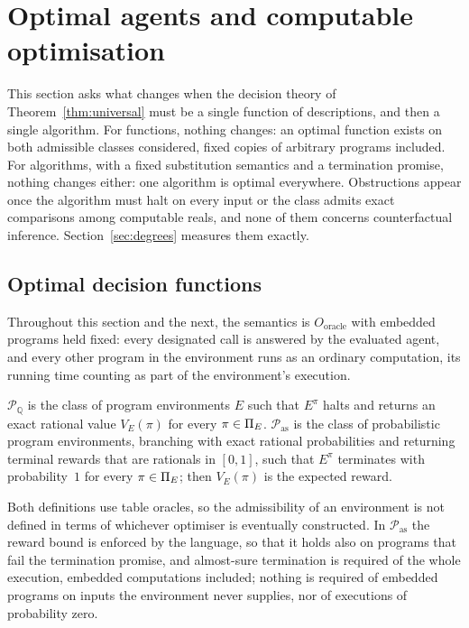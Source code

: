 \section{Optimal agents and computable optimisation}\label{sec:computation}

This section asks what changes when the decision theory of Theorem~\ref{thm:universal} must be a
single function of descriptions, and then a single algorithm. For functions, nothing changes: an
optimal function exists on both admissible classes considered, fixed copies of arbitrary programs
included. For algorithms, with a fixed substitution semantics and a termination promise, nothing
changes either: one algorithm is optimal everywhere. Obstructions appear once the algorithm must halt on every input or
the class admits exact comparisons among computable reals, and none of them concerns counterfactual
inference. Section~\ref{sec:degrees} measures them exactly.

\subsection{Optimal decision functions}

Throughout this section and the next, the semantics is $O_{\mathrm{oracle}}$ with embedded programs
held fixed: every designated call is answered by the evaluated agent, and every other program in the
environment runs as an ordinary computation, its running time counting as part of the environment's
execution.

\begin{definition}\label{def:promise}
$\mathcal P_{\mathbb Q}$ is the class of program environments $E$ such that $E^\pi$ halts and returns an
exact rational value $V_E(\pi)$ for every $\pi\in\Pi_E$. $\mathcal P_{\mathrm{as}}$ is the class of
probabilistic program environments, branching with exact rational probabilities and returning
terminal rewards that are rationals in $[0,1]$, such that $E^\pi$ terminates with probability~$1$ for
every $\pi\in\Pi_E$; then $V_E(\pi)$ is the expected reward.
\end{definition}

Both definitions use table oracles, so the admissibility of an environment is not defined in terms
of whichever optimiser is eventually constructed. In $\mathcal P_{\mathrm{as}}$ the reward bound is
enforced by the language, so that it holds also on programs that fail the termination promise, and
almost-sure termination is required of the whole execution, embedded computations included; nothing
is required of embedded programs on inputs the environment never supplies, nor of executions of
probability zero.

